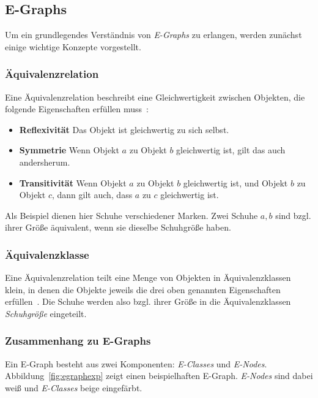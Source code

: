 \subsection{E-Graphs}

Um ein grundlegendes Verständnis von \textit{E-Graphs} zu erlangen, werden zunächst einige wichtige Konzepte vorgestellt.

\subsubsection{Äquivalenzrelation}

Eine Äquivalenzrelation beschreibt eine Gleichwertigkeit zwischen Objekten, die folgende Eigenschaften erfüllen muss~\cite{Ehrig2001}:

\begin{itemize}
  \item \textbf{Reflexivität} Das Objekt ist gleichwertig zu sich selbst.
  \item \textbf{Symmetrie} Wenn Objekt $a$ zu Objekt $b$ gleichwertig ist, gilt das auch andersherum.
  \item \textbf{Transitivität} Wenn Objekt $a$ zu Objekt $b$ gleichwertig ist, und Objekt $b$ zu Objekt $c$, dann gilt auch, dass $a$ zu $c$ gleichwertig ist.
\end{itemize}

Als Beispiel dienen hier Schuhe verschiedener Marken. Zwei Schuhe $a, b$ sind bzgl. ihrer Größe äquivalent, wenn sie dieselbe Schuhgröße haben. 

\subsubsection{Äquivalenzklasse}

Eine Äquivalenzrelation teilt eine Menge von Objekten in Äquivalenzklassen klein, in denen die Objekte jeweils die drei oben genannten Eigenschaften erfüllen~\cite{Ehrig2001}.
Die Schuhe werden also bzgl. ihrer Größe in die Äquivalenzklassen \textit{Schuhgröße} eingeteilt.

\subsubsection{Zusammenhang zu E-Graphs}

Ein E-Graph besteht aus zwei Komponenten: \textit{E-Classes} und \textit{E-Nodes}. Abbildung~\ref{fig:egraphexp} zeigt einen beispielhaften E-Graph.
\textit{E-Nodes} sind dabei weiß und \textit{E-Classes} beige eingefärbt.

